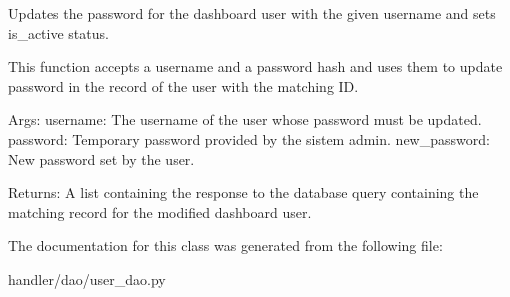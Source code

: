 \begin{DoxyVerb}Updates the password for the dashboard user with the given username and sets is_active status.

This function accepts a username and a password hash and uses them 
to update password in the record of the user with the matching ID.

Args:
    username: The username of the user whose password must be updated.
    password: Temporary password provided by the sistem admin.
    new_password: New password set by the user.

Returns:
    A list containing the response to the database query
    containing the matching record for the modified dashboard user.
\end{DoxyVerb}
 

The documentation for this class was generated from the following file\+:\begin{DoxyCompactItemize}
\item 
handler/dao/user\+\_\+dao.\+py\end{DoxyCompactItemize}
